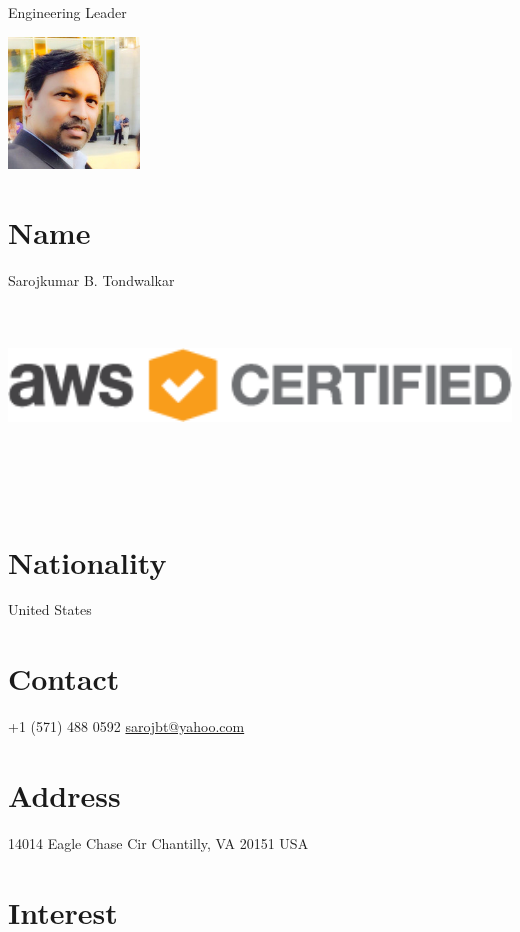 \documentclass[]{friggeri-cv}
\begin{document}
      {Engineering Leader}
      



\begin{aside}
\includegraphics[height=3.5cm]{0.jpg}
~
    ~      
  \section{Name}
     Sarojkumar B. Tondwalkar
    ~    
~
\includegraphics[angle=90,height=5cm]{img/AWS_Certified_Logo_SAA_294x230_Color.png}
~
    ~      
  \section{Nationality}
     United States
    ~    
~
~
  \section{Contact}
    +1 (571) 488 0592
    \href{mailto:sarojbt@yahoo.com}{sarojbt@yahoo.com}
   ~
~
~
\section{Address}
    14014 Eagle Chase Cir
    Chantilly, VA 20151
    USA
\end{aside}

\section{Interest}
\end{document}
